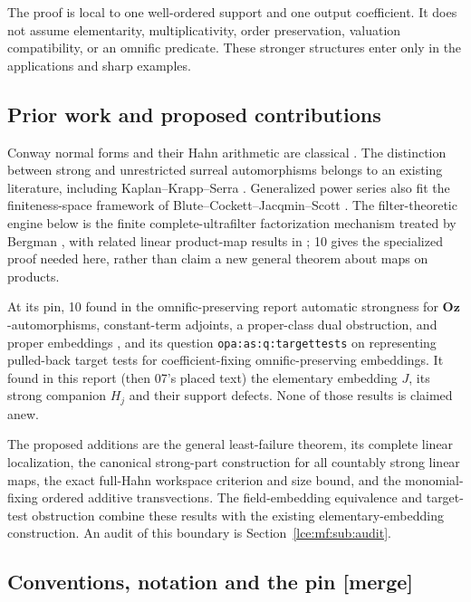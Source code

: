 \documentclass[11pt,letterpaper]{article}
\numberwithin{equation}{section}
\theoremstyle{definition}
\theoremstyle{remark}
\newcommand{\Oz}{\mathbf{Oz}}
\newcommand{\mergetag}{\textup{\textsf{\small[merge]}}}%
\newcommand{\lbl}[1]{\nolinkurl{#1}}%
\begin{document}
The proof is local to one well-ordered support and one output coefficient.
It does not assume elementarity, multiplicativity, order preservation,
valuation compatibility, or an omnific predicate. These stronger structures
enter only in the applications and sharp examples.

\subsection{Prior work and proposed contributions}
Conway normal forms and their Hahn arithmetic are classical
\cite{Conway,Gonshor}. The distinction between strong and unrestricted
surreal automorphisms belongs to an existing literature, including
Kaplan--Krapp--Serra \cite{KKS}. Generalized power series also fit the
finiteness-space framework of Blute--Cockett--Jacqmin--Scott \cite{BCJS}.
The filter-theoretic engine below is the finite complete-ultrafilter
factorization mechanism treated by Bergman \cite{BergmanFamilies}, with
related linear product-map results in \cite{BergmanNahlus}; 10 gives the
specialized proof needed here, rather than claim a new general theorem about
maps on products.

At its pin, 10 found in the omnific-preserving report automatic strongness
for $\Oz$-automorphisms, constant-term adjoints, a proper-class dual
obstruction, and proper embeddings \cite{RepoOpa}, and its question
\lbl{opa:as:q:targettests} on representing pulled-back target tests for
coefficient-fixing omnific-preserving embeddings. It found in this report
(then 07's placed text) the elementary embedding $J$, its strong companion
$H_j$ and their support defects. None of those results is claimed anew.

The proposed additions are the general least-failure theorem, its complete
linear localization, the canonical strong-part construction for all
countably strong linear maps, the exact full-Hahn workspace criterion and
size bound, and the monomial-fixing ordered additive transvections. The
field-embedding equivalence and target-test obstruction combine these
results with the existing elementary-embedding construction. An audit of
this boundary is Section~\ref{lce:mf:sub:audit}.

\subsection{Conventions, notation and the pin \mergetag}
\label{lce:mf:sub:conventions}
\end{document}
